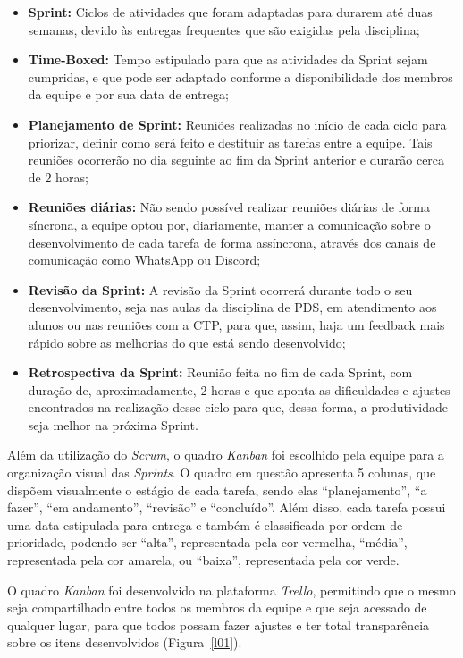 \documentclass[12pt,a4paper]{article}
\begin{document}
\begin{itemize}
    \item \textbf{Sprint:} Ciclos de atividades que foram adaptadas para durarem até duas semanas, devido às entregas frequentes que são exigidas pela disciplina;\cite{roberto}
    \item \textbf{Time-Boxed:} Tempo estipulado para que as atividades da Sprint sejam cumpridas, e que pode ser adaptado conforme a disponibilidade dos membros da equipe e por sua data de entrega;\cite{roberto}
    \item \textbf{Planejamento de Sprint:} Reuniões realizadas no início de cada ciclo para priorizar, definir como será feito e destituir as tarefas entre a equipe. Tais reuniões ocorrerão no dia seguinte ao fim da Sprint anterior e durarão cerca de 2 horas; \cite{roberto}
    \item \textbf{Reuniões diárias:} Não sendo possível realizar reuniões diárias de forma síncrona, a equipe optou por, diariamente, manter a comunicação sobre o desenvolvimento de cada tarefa de forma assíncrona, através dos canais de comunicação como WhatsApp ou Discord; \cite{roberto}
    \item \textbf{Revisão da Sprint:} A revisão da Sprint ocorrerá durante todo o seu desenvolvimento, seja nas aulas da disciplina de PDS, em atendimento aos alunos ou nas reuniões com a CTP, para que, assim, haja um feedback mais rápido sobre as melhorias do que está sendo desenvolvido; \cite{roberto}
    \item \textbf{Retrospectiva da Sprint:} Reunião feita no fim de cada Sprint, com duração de, aproximadamente, 2 horas e que aponta as dificuldades e ajustes encontrados na realização desse ciclo para que, dessa forma, a produtividade seja melhor na próxima Sprint. \cite{roberto}
\end{itemize}

Além da utilização do \textit{Scrum}, o quadro \textit{Kanban} foi escolhido pela equipe para a organização visual das \textit{Sprints}. O quadro em questão apresenta 5 colunas, que dispõem visualmente o estágio de cada tarefa, sendo elas “planejamento”, “a fazer”, “em andamento”, “revisão” e “concluído”. Além disso, cada tarefa possui uma data estipulada para entrega e também é classificada por ordem de prioridade, podendo ser “alta”, representada pela cor vermelha, “média”, representada pela cor amarela, ou “baixa”, representada pela cor verde. \cite{asana}

O quadro \textit{Kanban} foi desenvolvido na plataforma \textit{Trello}, permitindo que o mesmo seja compartilhado entre todos os membros da equipe e que seja acessado de qualquer lugar, para que todos possam fazer ajustes e ter total transparência sobre os itens desenvolvidos (Figura~\ref{l01}).
\end{document}

